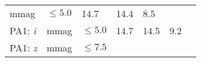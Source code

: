 \documentclass[DM, lsstdraft, toc]{lsstdoc}
\begin{document}
\begin{longtable}[]{@{}lllllll@{}}
\begin{minipage}[t]{0.06\columnwidth}
mmag\strut
\end{minipage} & \begin{minipage}[t]{0.14\columnwidth}\raggedright\strut
\(\leq 5.0\)\strut
\end{minipage} & \begin{minipage}[t]{0.12\columnwidth}\raggedright\strut
14.7\strut
\end{minipage} & \begin{minipage}[t]{0.12\columnwidth}\raggedright\strut
14.4\strut
\end{minipage} & \begin{minipage}[t]{0.12\columnwidth}\raggedright\strut
8.5\strut
\end{minipage} & \begin{minipage}[t]{0.17\columnwidth}\raggedright\strut
\strut
\end{minipage}\tabularnewline
\begin{minipage}[t]{0.12\columnwidth}\raggedright\strut
PA1: \emph{i}\strut
\end{minipage} & \begin{minipage}[t]{0.06\columnwidth}\raggedright\strut
mmag\strut
\end{minipage} & \begin{minipage}[t]{0.14\columnwidth}\raggedright\strut
\(\leq 5.0\)\strut
\end{minipage} & \begin{minipage}[t]{0.12\columnwidth}\raggedright\strut
14.7\strut
\end{minipage} & \begin{minipage}[t]{0.12\columnwidth}\raggedright\strut
14.5\strut
\end{minipage} & \begin{minipage}[t]{0.12\columnwidth}\raggedright\strut
9.2\strut
\end{minipage} & \begin{minipage}[t]{0.17\columnwidth}\raggedright\strut
\strut
\end{minipage}\tabularnewline
\begin{minipage}[t]{0.12\columnwidth}\raggedright\strut
PA1: \emph{z}\strut
\end{minipage} & \begin{minipage}[t]{0.06\columnwidth}\raggedright\strut
mmag\strut
\end{minipage} & \begin{minipage}[t]{0.14\columnwidth}\raggedright\strut
\(\leq 7.5\)\strut
\end{minipage} & \begin{minipage}[t]{0.12\columnwidth}\raggedright\strut

\end{minipage}
\end{longtable}
\end{document}
